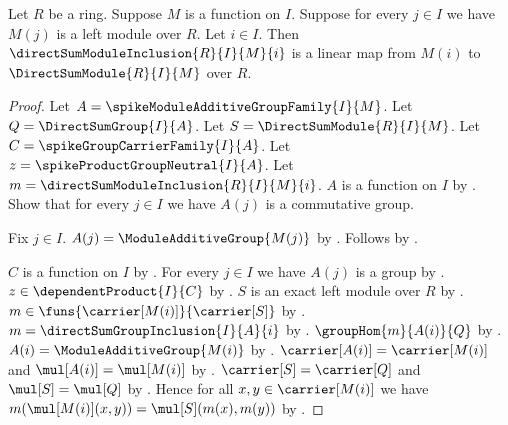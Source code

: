 \begin{theorem}\label{spike_direct_sum_module_inclusion_linear}
    Let $R$ be a ring.
    Suppose $M$ is a function on $I$.
    Suppose for every $j\in I$ we have $M(j)$ is a left module over $R$.
    Let $i\in I$.
    Then $\directSumModuleInclusion{R}{I}{M}{i}$ is a linear map from
        $M(i)$ to $\DirectSumModule{R}{I}{M}$ over $R$.
\end{theorem}
\begin{proof}
    Let $A=\spikeModuleAdditiveGroupFamily{I}{M}$.
    Let $Q=\DirectSumGroup{I}{A}$.
    Let $S=\DirectSumModule{R}{I}{M}$.
    Let $C=\spikeGroupCarrierFamily{I}{A}$.
    Let $z=\spikeProductGroupNeutral{I}{A}$.
    Let $m=\directSumModuleInclusion{R}{I}{M}{i}$.
    $A$ is a function on $I$ by
        .
    Show that for every $j\in I$ we have $A(j)$ is a commutative group.
    \begin{subproof}
        Fix $j\in I$.
        $A(j)=\ModuleAdditiveGroup{M(j)}$ by
            .
        Follows by .
    \end{subproof}
    $C$ is a function on $I$ by
        .
    For every $j\in I$ we have $A(j)$ is a group by
        .
    $z\in\dependentProduct{I}{C}$ by
        .
    $S$ is an exact left module over $R$ by
        .
    $m\in\funs{\carrier[M(i)]}{\carrier[S]}$ by
        .
    $m=\directSumGroupInclusion{I}{A}{i}$ by
        .
    $\groupHom{m}{A(i)}{Q}$ by
        .
    $A(i)=\ModuleAdditiveGroup{M(i)}$ by
        .
    $\carrier[A(i)]=\carrier[M(i)]$ and
        $\mul[A(i)]=\mul[M(i)]$ by
        .
    $\carrier[S]=\carrier[Q]$ and $\mul[S]=\mul[Q]$ by
        .
    Hence for all $x,y\in\carrier[M(i)]$ we have
        $m(\mul[M(i)](x,y))=\mul[S](m(x),m(y))$ by
        .


\end{proof}
